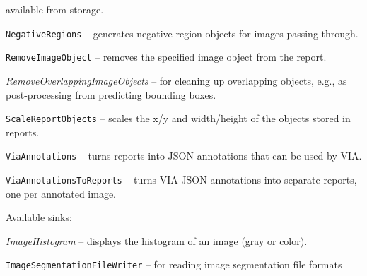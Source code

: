 \documentclass[a4paper]{book}
\begin{document}
\begin{tight_itemize}
  available from storage.
  \item \texttt{NegativeRegions} -- generates negative region objects
  for images passing through.
  \item \texttt{RemoveImageObject} -- removes the specified image object
  from the report.
  \item \textit{RemoveOverlappingImageObjects} -- for cleaning up
  overlapping objects, e.g., as post-processing from predicting bounding
  boxes.
  \item \texttt{ScaleReportObjects} -- scales the x/y and width/height
  of the objects stored in reports.
  \item \texttt{ViaAnnotations} -- turns reports into JSON annotations that
  can be used by VIA\cite{via}.
  \item \texttt{ViaAnnotationsToReports} -- turns VIA JSON annotations into
  separate reports, one per annotated image.
\end{tight_itemize}

\noindent Available sinks:
\begin{tight_itemize}
  \item \textit{ImageHistogram} -- displays the histogram of an image (gray or color).
  \item \texttt{ImageSegmentationFileWriter} -- for reading image segmentation file formats
\end{tight_itemize}


\end{document}
